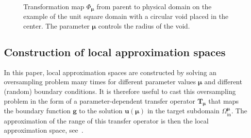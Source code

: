 \documentclass[a4paper]{eccomas_paper-2024}
\newcommand{\m}{\bm\mu}
\begin{document}
\begin{figure}
    \centering
    
    \caption{Transformation map $\Phi_{\bm\mu}$ from parent to physical domain on the example of the unit square domain with a circular void placed in the center. The parameter $\bm\mu$ controls the radius of the void.}\label{fig:transformationmap}
\end{figure}


\subsection{Construction of local approximation spaces} %
\label{sub:Construction of local approximation spaces}
In this paper, local approximation spaces are constructed by solving an oversampling problem many times for different parameter values $\bm\mu$ and different (random) boundary conditions.
It is therefore useful to cast this oversampling problem in the form of a parameter-dependent transfer operator $\bm{T}_{\bm\mu}$ that
maps the boundary function $\bm{g}$ to the solution $\bm{u}(\bm\mu)$ in the target subdomain $\varOmega^{\m}_{\mathrm{in}}$.
The approximation of the range of this transfer operator is then the local approximation space, see~\cite{Buhr2018Randomized}.
\end{document}
